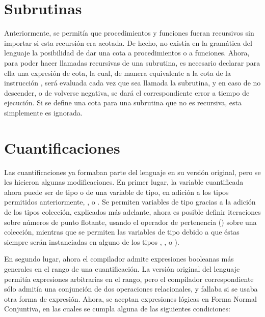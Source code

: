 \section{Subrutinas}

Anteriormente, se permitía que procedimientos y funciones fueran recursivos sin
importar si esta recursión era acotada. De hecho, no existía en la gramática del
lenguaje la posibilidad de dar una cota a procedimientos o a funciones. Ahora,
para poder hacer llamadas recursivas de una subrutina, es necesario declarar
para ella una expresión de cota, la cual, de manera equivalente a la cota de la
instrucción , será evaluada cada vez que sea llamada la subrutina, y
en caso de no descender, o de volverse negativa, se dará el correspondiente
error a tiempo de ejecución. Si se define una cota para una subrutina que no es
recursiva, esta simplemente es ignorada.

\section{Cuantificaciones}

Las cuantificaciones ya formaban parte del lenguaje en su versión original, pero
se les hicieron algunas modificaciones. En primer lugar, la variable cuantificada
ahora puede ser de tipo  o de una variable de tipo, en adición a
los tipos permitidos anteriormente,  ,  o
. Se permiten variables de tipo  gracias a la
adición de los tipos colección, explicados más adelante, ahora es posible
definir iteraciones sobre números de punto flotante, usando el operador de
pertenencia (\ingra{~\Elem~}) sobre una colección, mientras que se permiten las variables
de tipo debido a que éstas siempre serán instanciadas en alguno de los
tipos , ,  o ).

En segundo lugar, ahora el compilador admite expresiones booleanas más generales
en el rango de una cuantificación. La versión original del lenguaje permitía
expresiones arbitrarias en el rango, pero el compilador correspondiente sólo
admitía una conjunción de dos operaciones relacionales, y fallaba si se usaba
otra forma de expresión. Ahora, se aceptan expresiones lógicas en Forma Normal
Conjuntiva, en las cuales se cumpla alguna de las siguientes condiciones:

